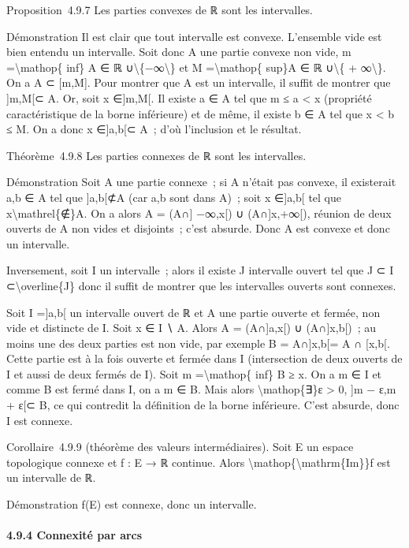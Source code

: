 \documentclass[]{article}
\begin{document}
Proposition~4.9.7 Les parties convexes de ℝ sont les intervalles.

Démonstration Il est clair que tout intervalle est convexe. L'ensemble
vide est bien entendu un intervalle. Soit donc A une partie convexe non
vide, m =\textbackslash{}mathop\{ inf\} A ∈ ℝ
∪\textbackslash{}\{−∞\textbackslash{}\} et M =\textbackslash{}mathop\{
sup\}A ∈ ℝ ∪\textbackslash{}\{ + ∞\textbackslash{}\}. On a A ⊂
{[}m,M{]}. Pour montrer que A est un intervalle, il suffit de montrer
que {]}m,M{[}⊂ A. Or, soit x ∈{]}m,M{[}. Il existe a ∈ A tel que m ≤ a
\textless{} x (propriété caractéristique de la borne inférieure) et de
même, il existe b ∈ A tel que x \textless{} b ≤ M. On a donc x
∈{]}a,b{[}⊂ A~; d'où l'inclusion et le résultat.

Théorème~4.9.8 Les parties connexes de ℝ sont les intervalles.

Démonstration Soit A une partie connexe~; si A n'était pas convexe, il
existerait a,b ∈ A tel que {]}a,b{[}⊄A (car a,b sont dans A)~; soit x
∈{]}a,b{[} tel que x\textbackslash{}mathrel\{∉\}A. On a alors A = (A∩{]}
−∞,x{[}) ∪ (A∩{]}x,+∞{[}), réunion de deux ouverts de A non vides et
disjoints~; c'est absurde. Donc A est convexe et donc un intervalle.

Inversement, soit I un intervalle~; alors il existe J intervalle ouvert
tel que J ⊂ I ⊂\textbackslash{}overline\{J\} donc il suffit de montrer
que les intervalles ouverts sont connexes.

Soit I ={]}a,b{[} un intervalle ouvert de ℝ et A une partie ouverte et
fermée, non vide et distincte de I. Soit x ∈ I ∖ A. Alors A =
(A∩{]}a,x{[}) ∪ (A∩{]}x,b{[})~; au moins une des deux parties est non
vide, par exemple B = A∩{]}x,b{[}= A ∩ {[}x,b{[}. Cette partie est à la
fois ouverte et fermée dans I (intersection de deux ouverts de I et
aussi de deux fermés de I). Soit m =\textbackslash{}mathop\{ inf\} B ≥
x. On a m ∈ I et comme B est fermé dans I, on a m ∈ B. Mais alors
\textbackslash{}mathop\{∃\}ε \textgreater{} 0, {]}m − ε,m + ε{[}⊂ B, ce
qui contredit la définition de la borne inférieure. C'est absurde, donc
I est connexe.

Corollaire~4.9.9 (théorème des valeurs intermédiaires). Soit E un espace
topologique connexe et f : E → ℝ continue. Alors
\textbackslash{}mathop\{\textbackslash{}mathrm\{Im\}\}f est un
intervalle de ℝ.

Démonstration f(E) est connexe, donc un intervalle.

\paragraph{4.9.4 Connexité par arcs}
\end{document}
